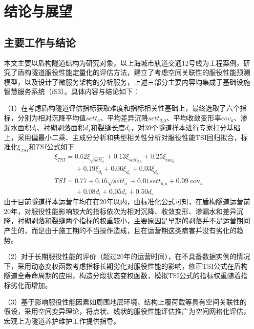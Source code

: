 \chapter{结论与展望}

\section{主要工作与结论}

本文主要以盾构隧道结构为研究对象，以上海城市轨道交通12号线为工程案例，研究了盾构隧道服役性能定量化的评估方法，建立了考虑空间关联性的服役性能预测模型，以及设计了微服务架构的分析服务，上述三部分主要内容均集成于基础设施智慧服务系统（iS3）。具体内容与结论如下：

（1）在考虑盾构隧道评估指标获取难度和指标相关性基础上，最终选取了六个指标，分别为相对沉降平均值${sett}_{a}$、平均差异沉降$set{{t}_{d\_a}}$、平均收敛变形率${cov}_{a}$、渗漏水面积${d}_{l}$、衬砌剥落面积${d}_{s}$和裂缝长度${d}_{c}$，对39个隧道样本进行专家打分基础上，采用偏最小二乘、主成分分析和典型相关性分析对服役性能TSI回归拟合，标准化${\xi }_{TSI}$和$TSI$公式如下
\begin{align}
  & {\xi }_{TSI}=0.62{\xi }_{\sqrt{set{{{{t}}}_{a}}}}+0.13{\xi }_{set{{{{t}}}_{d\_a}}}+0.25{\xi }_{cov_a} \nonumber \\ 
 & \quad \quad \quad +0.19{\xi }_{{{{d}}}_{l}}+0.06{\xi }_{{d}_{c}}+0.03{\xi }_{{{{d}}}_{s}} \nonumber \\
  & TSI=0.77+0.16\sqrt{set{{t}_{a}}}+0.01set{{t}_{d\_a}}+0.09{{\operatorname{cov}}_{a}} \nonumber \\ 
 & \quad \quad \quad +0.08{{d}_{l}}+0.05{{d}_{c}}+0.50{{d}_{s}} \nonumber 
\end{align}
由于目前隧道样本运营年均在在20年以内，由标准化公式可知，在盾构隧道运营前20年，对服役性能影响较大的指标依次为相对沉降、收敛变形、渗漏水和差异沉降，衬砌剥落和裂缝两个指标的权重较小，主要原因是早期的剥落并不是运营期间产生的，而是由于施工期的不当操作造成，且在运营期这类病害并没有劣化的趋势。

（2）对于长期服役性能的评价（超过20年的运营时间），在不具备数据实例的情况下，采用动态变权函数考虑指标长期劣化对服役性能的影响，修正TSI公式在盾构隧道全寿命周期的应用，构造分段状态变权函数，模拟TSI公式的指标权重随着指标劣化而增加。

（3）基于影响服役性能因素如周围地层环境、结构上覆荷载等具有空间关联性的假设，采用空间变异理论，将点状、线状的服役性能评估推广为空间网格化评估，宏观上为隧道养护维护工作提供指导。

